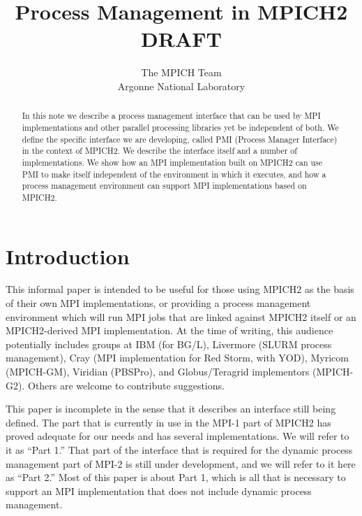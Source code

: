 \documentclass[11pt]{article}
\begin{document}
\title{{\bf Process Management in MPICH2}\\[.2in] DRAFT}
\author{The MPICH Team\\Argonne National Laboratory}
\maketitle

\begin{abstract}
  In this note we describe a process management interface that can be
  used by MPI implementations and other parallel processing libraries
  yet be independent of both.  We define the specific interface we are
  developing, called PMI (Process Manager Interface) in the context of
  MPICH2.  We describe the interface itself and a number of
  implementations.  We show how an MPI implementation built on MPICH2
  can use PMI to make itself independent of the environment in which it
  executes, and how a process management environment can support MPI
  implementations based on MPICH2.
\end{abstract}

\section{Introduction}
\label{sec:introduction}

This informal paper is intended to be useful for those using MPICH2 as the
basis of their own MPI implementations, or providing a process
management environment which will run MPI jobs that are linked against
MPICH2 itself or an MPICH2-derived MPI implementation.  At the time of
writing, this audience potentially includes groups at IBM (for BG/L), Livermore
(SLURM process management), Cray (MPI implementation for Red Storm, with
YOD), Myricom (MPICH-GM), Viridian (PBSPro), and Globus/Teragrid
implementors (MPICH-G2).  Others are welcome to contribute suggestions.

This paper is incomplete in the sense that it describes an interface
still being defined.  The part that is currently in use in the MPI-1
part of MPICH2 has proved adequate for our needs and has several
implementations.  We will refer to it as ``Part 1.''  That part of the
interface that is required for the dynamic process management part of
MPI-2 is still under development, and we will refer to it here as ``Part
2.''  Most of this paper is about Part 1, which is all that is necessary
to support an MPI implementation that does not include dynamic process
management.
\end{document}

